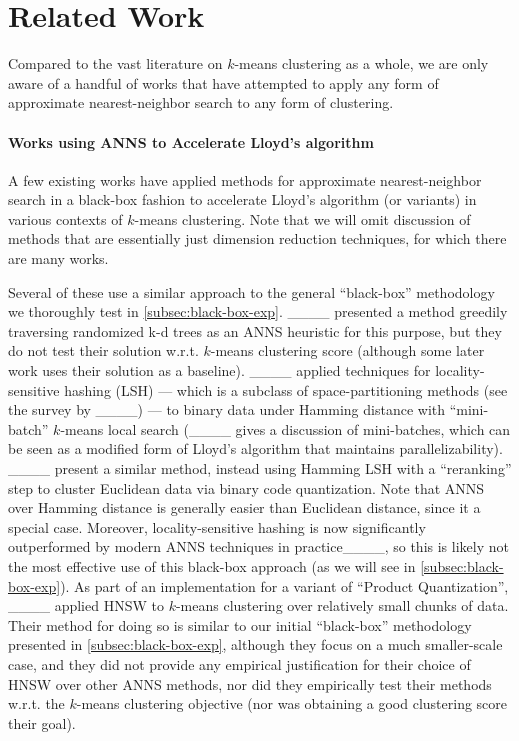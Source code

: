 \section{Related Work}
\label{subsec:related}

Compared to the vast literature on $k$-means clustering as a whole,
we are only aware of a handful of works that have attempted to apply
any form of approximate nearest-neighbor search to any form of clustering.

\paragraph{Works using ANNS to Accelerate Lloyd's algorithm}
A few existing works have applied
methods for approximate nearest-neighbor search
in a black-box fashion
to accelerate Lloyd's algorithm (or variants)
in various contexts of $k$-means clustering.
Note that we will omit discussion of methods
that are essentially just dimension reduction techniques,
for which there are many works.

Several of these use a similar approach to
the general ``black-box'' methodology
we thoroughly test in
\cref{subsec:black-box-exp}.
____ presented a method
greedily traversing randomized k-d trees as an ANNS heuristic for this purpose,
but they do not test their solution
w.r.t. $k$-means clustering score
(although some later work uses their solution as a baseline).
____ applied techniques for
locality-sensitive hashing
(LSH)
--- which is a subclass of
space-partitioning methods (see the survey by ____) --- 
to binary data under Hamming distance
with ``mini-batch'' $k$-means local search
(____ gives a discussion of mini-batches,
which can be seen as a modified form of Lloyd's algorithm
that maintains parallelizability).
____ present a similar method,
instead using Hamming LSH with a ``reranking'' step
to cluster Euclidean data via binary code quantization.
Note that ANNS over Hamming distance is generally easier than
Euclidean distance, since it a special case.
Moreover, locality-sensitive hashing
is now significantly outperformed
by modern ANNS techniques in practice____,
so this is likely not the most effective use of this black-box approach
(as we will see in \cref{subsec:black-box-exp}).
As part of an implementation
for a variant of ``Product Quantization'',
____ applied
HNSW to $k$-means clustering over
relatively small chunks of data.
Their method for doing so
is similar to our initial ``black-box'' methodology
presented in
\cref{subsec:black-box-exp},
although they focus on a much smaller-scale case,
and they did not provide any empirical justification
for their choice of HNSW over other ANNS methods,
nor did they empirically test their methods w.r.t. the $k$-means clustering objective
(nor was obtaining a good clustering score their goal).

